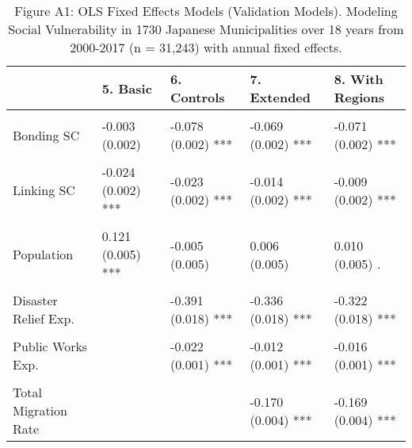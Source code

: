 \begin{table}

\caption{Figure A1: OLS Fixed Effects Models (Validation Models). Modeling Social Vulnerability in 1730 Japanese Municipalities over 18 years from 2000-2017 (n = 31,243) with annual fixed effects.}
\begin{threeparttable}
\begin{tabular}[t]{lllll}
\toprule
 & 5. Basic & 6. Controls & 7. Extended & 8. With Regions\\
\midrule
\textbf{\cellcolor{gray!6}{Direct Effects}} & \textbf{\cellcolor{gray!6}{}} & \textbf{\cellcolor{gray!6}{}} & \textbf{\cellcolor{gray!6}{}} & \textbf{\cellcolor{gray!6}{}}\\
Bonding SC & -0.003 (0.002) & -0.078 (0.002) *** & -0.069 (0.002) *** & -0.071 (0.002) ***\\
\cellcolor{gray!6}{Bridging SC} & \cellcolor{gray!6}{0.009 (0.001) ***} & \cellcolor{gray!6}{0.043 (0.001) ***} & \cellcolor{gray!6}{0.032 (0.001) ***} & \cellcolor{gray!6}{0.023 (0.001) ***}\\
Linking SC & -0.024 (0.002) *** & -0.023 (0.002) *** & -0.014 (0.002) *** & -0.009 (0.002) ***\\
\textbf{\cellcolor{gray!6}{Controls}} & \textbf{\cellcolor{gray!6}{}} & \textbf{\cellcolor{gray!6}{}} & \textbf{\cellcolor{gray!6}{}} & \textbf{\cellcolor{gray!6}{}}\\
\addlinespace
Population & 0.121 (0.005) *** & -0.005 (0.005) & 0.006 (0.005) & 0.010 (0.005) .\\
\cellcolor{gray!6}{Financial Strength} & \cellcolor{gray!6}{} & \cellcolor{gray!6}{0.084 (0.002) ***} & \cellcolor{gray!6}{0.090 (0.002) ***} & \cellcolor{gray!6}{0.089 (0.003) ***}\\
Disaster Relief Exp. &  & -0.391 (0.018) *** & -0.336 (0.018) *** & -0.322 (0.018) ***\\
\textbf{\cellcolor{gray!6}{Emergency Services Exp.}} & \textbf{\cellcolor{gray!6}{}} & \textbf{\cellcolor{gray!6}{-0.040 (0.001) ***}} & \textbf{\cellcolor{gray!6}{-0.044 (0.001) ***}} & \textbf{\cellcolor{gray!6}{-0.043 (0.001) ***}}\\
Public Works Exp. &  & -0.022 (0.001) *** & -0.012 (0.001) *** & -0.016 (0.001) ***\\
\addlinespace
\cellcolor{gray!6}{Disaster Conditions} & \cellcolor{gray!6}{} & \cellcolor{gray!6}{} & \cellcolor{gray!6}{0.038 (0.008) ***} & \cellcolor{gray!6}{0.047 (0.008) ***}\\
Total Migration Rate &  &  & -0.170 (0.004) *** & -0.169 (0.004) ***\\

\end{tabular}
\end{threeparttable}
\end{table}
